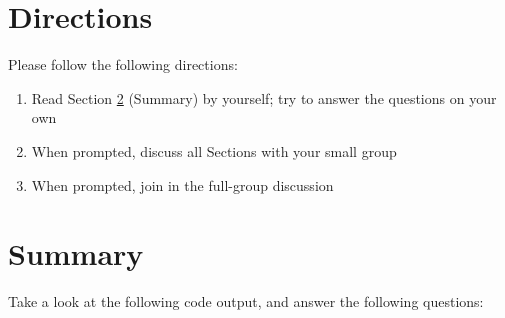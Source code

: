 \documentclass{article}
\begin{document}
\section{Directions}
Please follow the following directions:

\begin{enumerate}
\item Read Section \ref{sec:summary} (Summary) by yourself; try to answer the
  questions on your own
\item When prompted, discuss all Sections with your small group
\item When prompted, join in the full-group discussion
\end{enumerate}

\section{Summary} \label{sec:summary}
Take a look at the following code output, and answer the following questions:
\end{document}
